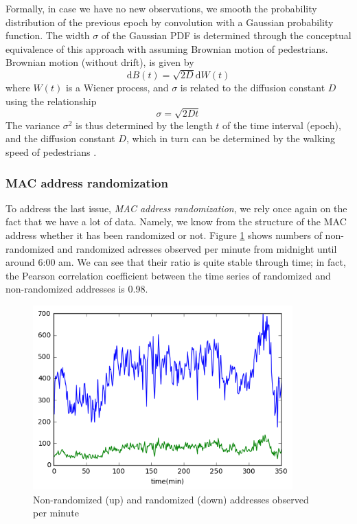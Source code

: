 \documentclass[10pt,a4paper]{article}
\begin{document}
Formally, in case we have no new observations, we smooth the probability distribution of the previous epoch by convolution with a Gaussian probability function. The width $\sigma$ of the Gaussian PDF is determined through the conceptual equivalence of this approach with assuming Brownian motion of pedestrians. Brownian motion (without drift), is given by
\begin{equation}
\text{d}B(t)=\sqrt{2D}\text{d}W(t)
\end{equation}
where $W(t)$ is a Wiener process, and $\sigma$ is related to the diffusion constant $D$ using the relationship
\begin{equation}
\sigma=\sqrt{2Dt}
\end{equation}
The variance $\sigma^2$ is thus determined by the length $t$ of the time interval (epoch), and the diffusion constant $D$, which in turn can be determined by the walking speed of pedestrians \cite{ebeling}.\\




\subsubsection{MAC address randomization}

To address the last issue, {\it MAC address randomization}, we rely once again on the fact that we have a lot of data. Namely, we know from the structure of the MAC address whether it has been randomized or not. Figure \ref{fig:nonrandomizedadresses} shows numbers of non-randomized and randomized adresses observed per minute from midnight until around 6:00 am. We can see that their ratio is quite stable through time; in fact, the Pearson correlation coefficient between the time series of randomized and non-randomized addresses is 0.98. 
 

\begin{figure}[h!]
	\centering
	\includegraphics[width=100mm]{rand_nonrand.png}
	\caption{Non-randomized (up) and randomized (down) addresses observed per minute}
	\label{fig:nonrandomizedadresses}
\end{figure} 
 
\end{document}
